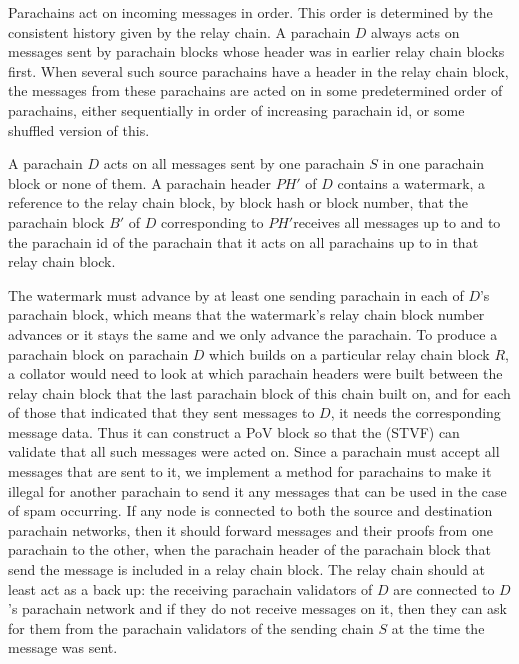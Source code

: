 Parachains act on incoming messages in order. This order is determined by the consistent history given by the relay chain.  A parachain $D$ always acts on messages sent by parachain blocks whose header was in earlier relay chain blocks first. When several such source parachains have a header in the relay chain block, the messages from these parachains are acted on in some predetermined order of parachains, either sequentially in order of increasing parachain id, or some shuffled version of this.

A parachain $D$ acts on all messages sent by one parachain $S$ in one parachain block or none of them. A parachain header $PH'$ of $D$ contains a watermark, a reference to the relay chain block, by block hash or block number, that the parachain block $B'$ of $D$ corresponding to $PH'$receives all messages up to and to the parachain id of the parachain that it acts on all parachains up to in that relay chain block.

The watermark must advance by at least one sending parachain in each of $D$'s parachain block, which means that the watermark's relay chain block number advances or it stays the same and we only advance the parachain. To produce a parachain block on parachain $D$ which builds on a particular relay chain block $R$, a collator would need to look at which parachain headers were built between the relay chain block that the last parachain block of this chain built on,
and for each of those that indicated that they sent messages to $D$, it needs the corresponding message data.
Thus it can construct a PoV block so that the (STVF) can validate that all such messages were acted on. Since a parachain must accept all messages that are sent to it,
we implement a method for parachains to make it illegal for another parachain to send it any messages that can be used in the case of spam occurring. If any node is connected to both the source and destination parachain networks, then it should forward messages and their proofs from one parachain to the other,
when the parachain header of the parachain block that send the message is included in a relay chain block. The relay chain should at least act as a back up: the receiving parachain validators  of $D$ are connected to $D$'s parachain network and if they do not receive messages on it, then they can ask for them from the parachain validators of the sending chain $S$ at the time the message was sent.

